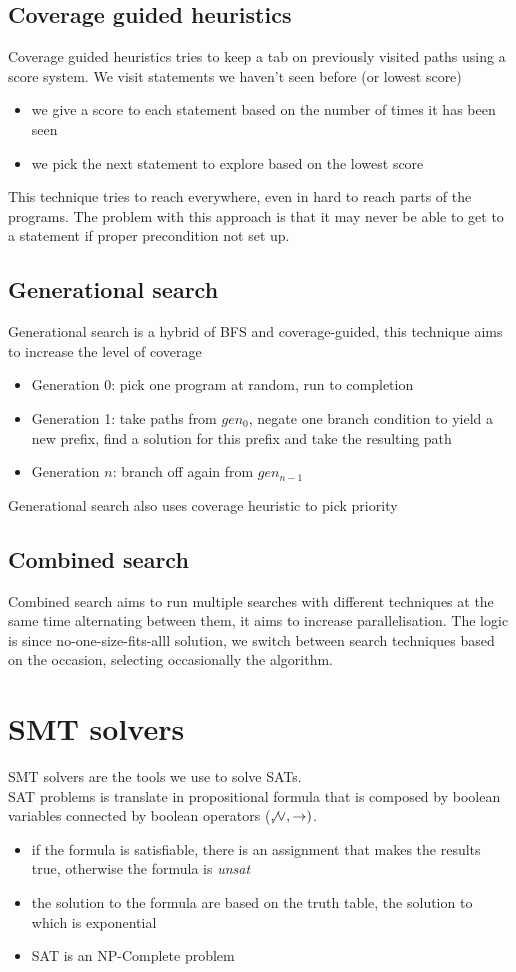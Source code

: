 \documentclass[11pt, oneside]{article}   	%
\begin{document}
\subsection*{Coverage guided heuristics}
Coverage guided heuristics tries to keep a tab on previously visited paths using a score system. We visit statements we haven't seen before (or lowest score)
\begin{itemize}
\item we give a score to each statement based on the number of times it has been seen
\item we pick the next statement to explore based on the lowest score
\end{itemize}
This technique tries to reach everywhere, even in hard to reach parts of the programs. The problem with this approach is that it may never be able to get to a statement if proper precondition not set up.

\subsection*{Generational search}
Generational search is a hybrid of BFS and coverage-guided, this technique aims to increase the level of coverage
\begin{itemize}
\item Generation 0: pick one program at random, run to completion
\item Generation 1: take paths from $gen_0$, negate one branch condition to yield a new prefix, find a solution for this prefix and take the resulting path
\item Generation $n$: branch off again from $gen_{n-1}$
\end{itemize}
Generational search also uses coverage heuristic to pick priority

\subsection*{Combined search}
Combined search aims to run multiple searches with different techniques at the same time alternating between them, it aims to increase parallelisation. The logic is since no-one-size-fits-alll solution, we switch between search techniques based on the occasion, selecting occasionally the algorithm.

\section*{SMT solvers}
SMT solvers are the tools we use to solve SATs.\\
SAT problems is translate in propositional formula that is composed by boolean variables connected by boolean operators ($\not, \lor, \rightarrow)$. \begin{itemize}
\item if the formula is satisfiable, there is an assignment that makes the results true, otherwise the formula is \emph{unsat}
\item the solution to the formula are based on the truth table, the solution to which is exponential
\item SAT is an NP-Complete problem
\end{itemize}
\end{document}
